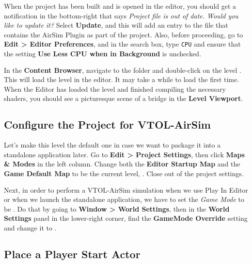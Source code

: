 When the project has been built and is opened in the editor, you should get a notification in the bottom-right that says \textit{Project file is out of date. Would you like to update it?} Select \textbf{Update}, and this will add an entry to the  file that contains the AirSim Plugin as part of the project. Also, before proceeding, go to \textbf{Edit > Editor Preferences}, and in the search box, type \texttt{CPU} and ensure that the setting \textbf{Use Less CPU when in Background} is unchecked.

In the \textbf{Content Browser}, navigate to the folder  and double-click on the level . This will load the level in the editor. It may take a while to load the first time. When the Editor has loaded the level and finished compiling the necessary shaders, you should see a picturesque scene of a bridge in the \textbf{Level Viewport}.

\subsection{Configure the Project for VTOL-AirSim}
Let's make this level the default one in case we want to package it into a standalone application later. Go to \textbf{Edit > Project Settings}, then click \textbf{Maps \& Modes} in the left column. Change both the \textbf{Editor Startup Map} and the \textbf{Game Default Map} to be the current level, . Close out of the project settings.

Next, in order to perform a VTOL-AirSim simulation when we use Play In Editor or when we launch the standalone application, we have to set the \textit{Game Mode} to be . Do that by going to \textbf{Window > World Settings}, then in the \textbf{World Settings} panel in the lower-right corner, find the \textbf{GameMode Override} setting and change it to .

\subsection{Place a Player Start Actor}


